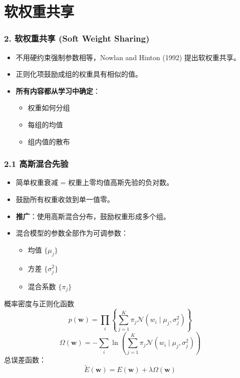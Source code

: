 \documentclass[t,aspectratio=169]{beamer} %
\begin{document}
\section{软权重共享}

\begin{frame}
    \frametitle{2. 软权重共享 (Soft Weight Sharing)}
    \begin{itemize}
        \item 不用硬约束强制参数相等，Nowlan and Hinton (1992) 提出\alert{软权重共享}。
        \item 正则化项鼓励\alert{成组的权重具有相似的值}。
        \item \textbf{所有内容都从学习中确定}：
        \begin{itemize}
            \item 权重如何分组
            \item 每组的均值
            \item 组内值的散布
        \end{itemize}
    \end{itemize}
\end{frame}

\begin{frame}[allowframebreaks]
    \frametitle{2.1 高斯混合先验}
    \begin{itemize}
        \item 简单权重衰减 = 权重上\alert{零均值高斯先验}的负对数。
        \item 鼓励所有权重收敛到\alert{单一值零}。
        \item \textbf{推广}：使用\alert{高斯混合}分布，鼓励权重形成\alert{多个组}。
        \item 混合模型的参数全部作为可调参数：
        \begin{itemize}
            \item 均值 $\{\mu_j\}$
            \item 方差 $\{\sigma_j^2\}$
            \item 混合系数 $\{\pi_j\}$
        \end{itemize}
    \end{itemize}
    \begin{block}{概率密度与正则化函数}
        \begin{equation}
            p(\mathbf{w}) = \prod_i \left\{ \sum_{j=1}^K \pi_j \mathcal{N}(w_i \mid \mu_j, \sigma_j^2) \right\}
            \tag{9.21}
        \end{equation}
        \begin{equation}
            \Omega(\mathbf{w}) = - \sum_i \ln \left( \sum_{j=1}^K \pi_j \mathcal{N}(w_i \mid \mu_j, \sigma_j^2) \right)
            \tag{9.22}
        \end{equation}
        总误差函数：
        \begin{equation}
            \widetilde{E}(\mathbf{w}) = E(\mathbf{w}) + \lambda \Omega(\mathbf{w})
            \tag{9.23}
        \end{equation}
    \end{block}
\end{frame}
\end{document}

